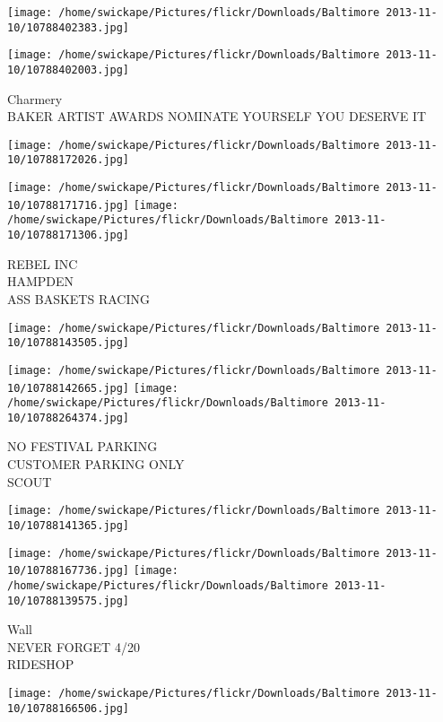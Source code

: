 \documentclass[10pt,letterpaper]{article}
\begin{document}
\texttt{[image: /home/swickape/Pictures/flickr/Downloads/Baltimore 2013-11-10/10788402383.jpg]}

\vspace{0.25in}
\texttt{[image: /home/swickape/Pictures/flickr/Downloads/Baltimore 2013-11-10/10788402003.jpg]}

Charmery\\
BAKER ARTIST AWARDS NOMINATE YOURSELF YOU DESERVE IT
\pagebreak

\texttt{[image: /home/swickape/Pictures/flickr/Downloads/Baltimore 2013-11-10/10788172026.jpg]}

\vspace{0.25in}
\texttt{[image: /home/swickape/Pictures/flickr/Downloads/Baltimore 2013-11-10/10788171716.jpg]}
\texttt{[image: /home/swickape/Pictures/flickr/Downloads/Baltimore 2013-11-10/10788171306.jpg]}

REBEL INC\\
HAMPDEN\\
ASS BASKETS RACING
\pagebreak

\texttt{[image: /home/swickape/Pictures/flickr/Downloads/Baltimore 2013-11-10/10788143505.jpg]}

\vspace{0.25in}
\texttt{[image: /home/swickape/Pictures/flickr/Downloads/Baltimore 2013-11-10/10788142665.jpg]}
\texttt{[image: /home/swickape/Pictures/flickr/Downloads/Baltimore 2013-11-10/10788264374.jpg]}

NO FESTIVAL PARKING\\
CUSTOMER PARKING ONLY\\
SCOUT
\pagebreak

\texttt{[image: /home/swickape/Pictures/flickr/Downloads/Baltimore 2013-11-10/10788141365.jpg]}

\vspace{0.25in}
\texttt{[image: /home/swickape/Pictures/flickr/Downloads/Baltimore 2013-11-10/10788167736.jpg]}
\texttt{[image: /home/swickape/Pictures/flickr/Downloads/Baltimore 2013-11-10/10788139575.jpg]}

Wall\\
NEVER FORGET 4/20\\
RIDESHOP
\pagebreak

\texttt{[image: /home/swickape/Pictures/flickr/Downloads/Baltimore 2013-11-10/10788166506.jpg]}
\end{document}

